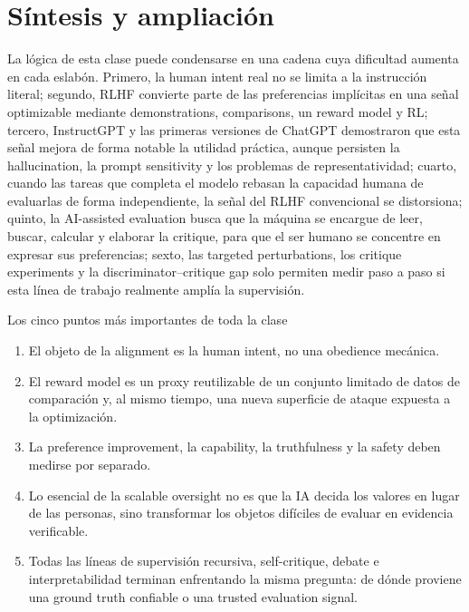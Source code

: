 \section{Síntesis y ampliación}

La lógica de esta clase puede condensarse en una cadena cuya dificultad aumenta en cada eslabón. Primero, la human intent real no se limita a la instrucción literal; segundo, RLHF convierte parte de las preferencias implícitas en una señal optimizable mediante demonstrations, comparisons, un reward model y RL; tercero, InstructGPT y las primeras versiones de ChatGPT demostraron que esta señal mejora de forma notable la utilidad práctica, aunque persisten la hallucination, la prompt sensitivity y los problemas de representatividad; cuarto, cuando las tareas que completa el modelo rebasan la capacidad humana de evaluarlas de forma independiente, la señal del RLHF convencional se distorsiona; quinto, la AI-assisted evaluation busca que la máquina se encargue de leer, buscar, calcular y elaborar la critique, para que el ser humano se concentre en expresar sus preferencias; sexto, las targeted perturbations, los critique experiments y la discriminator--critique gap solo permiten medir paso a paso si esta línea de trabajo realmente amplía la supervisión.

\begin{importantbox}{Los cinco puntos más importantes de toda la clase}
\begin{enumerate}
  \item El objeto de la alignment es la human intent, no una obedience mecánica.
  \item El reward model es un proxy reutilizable de un conjunto limitado de datos de comparación y, al mismo tiempo, una nueva superficie de ataque expuesta a la optimización.
  \item La preference improvement, la capability, la truthfulness y la safety deben medirse por separado.
  \item Lo esencial de la scalable oversight no es que la IA decida los valores en lugar de las personas, sino transformar los objetos difíciles de evaluar en evidencia verificable.
  \item Todas las líneas de supervisión recursiva, self-critique, debate e interpretabilidad terminan enfrentando la misma pregunta: de dónde proviene una ground truth confiable o una trusted evaluation signal.
\end{enumerate}
\end{importantbox}

